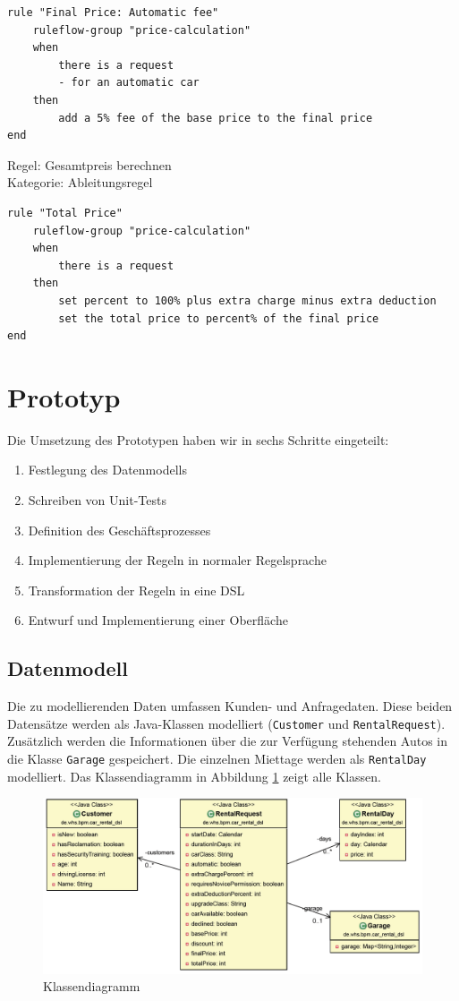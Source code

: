 \begin{lstlisting}
rule "Final Price: Automatic fee"
	ruleflow-group "price-calculation"
	when
		there is a request
		- for an automatic car
	then
		add a 5% fee of the base price to the final price
end
\end{lstlisting}

Regel: Gesamtpreis berechnen \\
Kategorie: Ableitungsregel

\begin{lstlisting}
rule "Total Price"
	ruleflow-group "price-calculation"
	when
		there is a request
	then
		set percent to 100% plus extra charge minus extra deduction
		set the total price to percent% of the final price
end
\end{lstlisting}


\section{Prototyp}

Die Umsetzung des Prototypen haben wir in sechs Schritte eingeteilt:
\begin{enumerate}
	\item Festlegung des Datenmodells
	\item Schreiben von Unit-Tests
	\item Definition des Geschäftsprozesses
	\item Implementierung der Regeln in normaler Regelsprache
	\item Transformation der Regeln in eine DSL
	\item Entwurf und Implementierung einer Oberfläche
\end{enumerate}

\subsection{Datenmodell}

Die zu modellierenden Daten umfassen Kunden- und Anfragedaten. Diese beiden Datensätze
werden als Java-Klassen modelliert (\texttt{Customer} und \texttt{RentalRequest}). Zusätzlich werden die
Informationen über die zur Verfügung stehenden Autos in die Klasse \texttt{Garage} gespeichert.
Die einzelnen Miettage werden als \texttt{RentalDay} modelliert. Das Klassendiagramm in
Abbildung \ref{fig:Class_All} zeigt alle Klassen.

\begin{figure}[tbh]
\centering
\includegraphics[width=1.0\linewidth]{Bilder/Class_All}
\caption{Klassendiagramm}
\label{fig:Class_All}
\end{figure}

